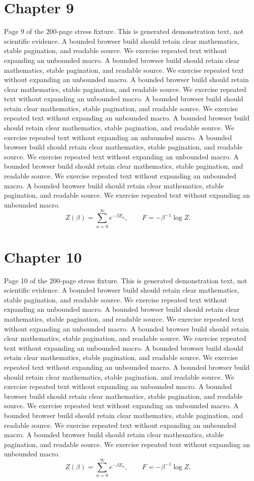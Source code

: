 \documentclass[11pt]{article}
\begin{document}
\section*{Chapter 9}
Page 9 of the 200-page stress fixture. This is generated demonstration text, not scientific evidence.
A bounded browser build should retain clear mathematics, stable pagination, and readable source. We exercise repeated text without expanding an unbounded macro.
A bounded browser build should retain clear mathematics, stable pagination, and readable source. We exercise repeated text without expanding an unbounded macro.
A bounded browser build should retain clear mathematics, stable pagination, and readable source. We exercise repeated text without expanding an unbounded macro.
A bounded browser build should retain clear mathematics, stable pagination, and readable source. We exercise repeated text without expanding an unbounded macro.
A bounded browser build should retain clear mathematics, stable pagination, and readable source. We exercise repeated text without expanding an unbounded macro.
A bounded browser build should retain clear mathematics, stable pagination, and readable source. We exercise repeated text without expanding an unbounded macro.
A bounded browser build should retain clear mathematics, stable pagination, and readable source. We exercise repeated text without expanding an unbounded macro.
A bounded browser build should retain clear mathematics, stable pagination, and readable source. We exercise repeated text without expanding an unbounded macro.
\[Z(\beta)=\sum_{n=0}^{\infty}e^{-\beta E_n},\qquad F=-\beta^{-1}\log Z.\]
\newpage
\section*{Chapter 10}
Page 10 of the 200-page stress fixture. This is generated demonstration text, not scientific evidence.
A bounded browser build should retain clear mathematics, stable pagination, and readable source. We exercise repeated text without expanding an unbounded macro.
A bounded browser build should retain clear mathematics, stable pagination, and readable source. We exercise repeated text without expanding an unbounded macro.
A bounded browser build should retain clear mathematics, stable pagination, and readable source. We exercise repeated text without expanding an unbounded macro.
A bounded browser build should retain clear mathematics, stable pagination, and readable source. We exercise repeated text without expanding an unbounded macro.
A bounded browser build should retain clear mathematics, stable pagination, and readable source. We exercise repeated text without expanding an unbounded macro.
A bounded browser build should retain clear mathematics, stable pagination, and readable source. We exercise repeated text without expanding an unbounded macro.
A bounded browser build should retain clear mathematics, stable pagination, and readable source. We exercise repeated text without expanding an unbounded macro.
A bounded browser build should retain clear mathematics, stable pagination, and readable source. We exercise repeated text without expanding an unbounded macro.
\[Z(\beta)=\sum_{n=0}^{\infty}e^{-\beta E_n},\qquad F=-\beta^{-1}\log Z.\]
\newpage
\end{document}
